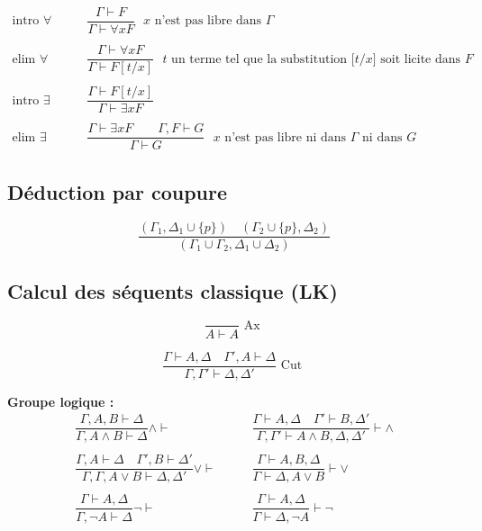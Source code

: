 \documentclass[french]{article}
\begin{document}
\begin{align*}
\text{intro $\forall$} &\qquad\dfrac{\Gamma\vdash F}{\Gamma\vdash\forall x F}\text{ $x$ n'est pas libre dans $\Gamma$}\\
\\
\text{elim $\forall$} &\qquad\dfrac{\Gamma\vdash\forall x F}{\Gamma\vdash F[t/x]}\text{ $t$ un terme tel que la substitution [$t$/$x$] soit licite dans $F$}\\
\\
\text{intro $\exists$} &\qquad\dfrac{\Gamma\vdash F[t/x]}{\Gamma\vdash\exists x F}\\
\\
\text{elim $\exists$} &\qquad\dfrac{\Gamma\vdash\exists x F\qquad\Gamma, F\vdash G}{\Gamma\vdash G}\text{ $x$ n'est pas libre ni dans $\Gamma$ ni dans $G$}
\end{align*}

\subsection{Déduction par coupure}

\[\dfrac{(\Gamma_1,\Delta_1\cup\{p\}) \quad (\Gamma_2\cup\{p\}, \Delta_2)}{(\Gamma_1\cup\Gamma_2, \Delta_1\cup\Delta_2)}\]


\subsection{Calcul des séquents classique (LK)}

\[\dfrac{}{A \vdash A} \text{ Ax }\]

\[\dfrac{\Gamma \vdash A,\Delta \quad \Gamma',A \vdash \Delta}{\Gamma,\Gamma' \vdash \Delta, \Delta'} \text{ Cut }\]

\textbf{Groupe logique :}
\begin{align*}
\dfrac{\Gamma,A,B \vdash \Delta}{\Gamma, A \land B \vdash \Delta} \land \vdash &\qquad 
\dfrac{\Gamma \vdash A,\Delta \quad \Gamma' \vdash B,\Delta'}{\Gamma,\Gamma' \vdash A \land B, \Delta, \Delta'} \vdash \land \\ 
\\
\dfrac{\Gamma, A \vdash\Delta \quad \Gamma', B \vdash \Delta'}{\Gamma,\Gamma,  A \lor B \vdash \Delta, \Delta'} \lor \vdash    &\qquad 
\dfrac{\Gamma \vdash A, B, \Delta}{\Gamma \vdash \Delta, A \lor B} \vdash \lor\\
\\
\dfrac{\Gamma \vdash A, \Delta}{\Gamma, \neg A \vdash \Delta} \neg \vdash  &\qquad 
\dfrac{\Gamma \vdash A,\Delta}{\Gamma \vdash \Delta, \neg A} \vdash \neg
\end{align*}
\end{document}

